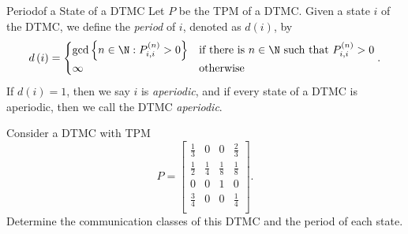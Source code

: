 \documentclass[stat333]{subfiles}
\begin{document}
    \begin{definition}{Period}{of a State of a DTMC}
        Let $P$ be the TPM of a DTMC. Given a state $i$ of the DTMC, we define the \emph{period} of $i$, denoted as $d\left( i \right)$, by
        \begin{equation*}
            d\left( i \right) = 
            \begin{cases} 
                \gcd\left\lbrace n\in\N: P^{\left( n \right)}_{i,i}>0 \right\rbrace & \text{if there is $n\in\N$ such that $P^{\left( n \right)}_{i,i}>0$} \\
                \infty & \text{otherwise}
            \end{cases}.
        \end{equation*}
        If $d\left( i \right)=1$, then we say $i$ is \emph{aperiodic}, and if every state of a DTMC is aperiodic, then we call the DTMC \emph{aperiodic}.
    \end{definition}

    \ex Consider a DTMC with TPM
    \begin{equation*}
        P =
        \begin{bmatrix}
        	\frac{1}{3} & 0 & 0 & \frac{2}{3} \\
        	\frac{1}{2} & \frac{1}{4} & \frac{1}{8} & \frac{1}{8} \\
        	0 & 0 & 1 & 0 \\
        	\frac{3}{4} & 0 & 0 & \frac{1}{4} \\
        \end{bmatrix}.
    \end{equation*}
    Determine the communication classes of this DTMC and the period of each state.
\end{document}

